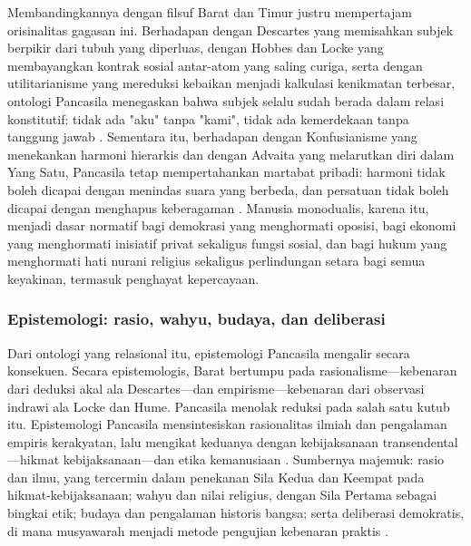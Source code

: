 \documentclass[journal]{IEEEtran}
\begin{document}
Membandingkannya dengan filsuf Barat dan Timur justru mempertajam orisinalitas gagasan ini. Berhadapan dengan Descartes yang memisahkan subjek berpikir dari tubuh yang diperluas, dengan Hobbes dan Locke yang membayangkan kontrak sosial antar-atom yang saling curiga, serta dengan utilitarianisme yang mereduksi kebaikan menjadi kalkulasi kenikmatan terbesar, ontologi Pancasila menegaskan bahwa subjek selalu sudah berada dalam relasi konstitutif: tidak ada "aku" tanpa "kami", tidak ada kemerdekaan tanpa tanggung jawab \cite{locke1988,mill1978,berlin1969}. Sementara itu, berhadapan dengan Konfusianisme yang menekankan harmoni hierarkis dan dengan Advaita yang melarutkan diri dalam Yang Satu, Pancasila tetap mempertahankan martabat pribadi: harmoni tidak boleh dicapai dengan menindas suara yang berbeda, dan persatuan tidak boleh dicapai dengan menghapus keberagaman \cite{latif2018,madungmere2021,taylor1994}. Manusia monodualis, karena itu, menjadi dasar normatif bagi demokrasi yang menghormati oposisi, bagi ekonomi yang menghormati inisiatif privat sekaligus fungsi sosial, dan bagi hukum yang menghormati hati nurani religius sekaligus perlindungan setara bagi semua keyakinan, termasuk penghayat kepercayaan.

\subsubsection{Epistemologi: rasio, wahyu, budaya, dan deliberasi}

Dari ontologi yang relasional itu, epistemologi Pancasila mengalir secara konsekuen. Secara epistemologis, Barat bertumpu pada rasionalisme---kebenaran dari deduksi akal ala Descartes---dan empirisme---kebenaran dari observasi indrawi ala Locke dan Hume. Pancasila menolak reduksi pada salah satu kutub itu. Epistemologi Pancasila mensintesiskan rasionalitas ilmiah dan pengalaman empiris kerakyatan, lalu mengikat keduanya dengan kebijaksanaan transendental---hikmat kebijaksanaan---dan etika kemanusiaan \cite{pristiwiyanto2021}. Sumbernya majemuk: rasio dan ilmu, yang tercermin dalam penekanan Sila Kedua dan Keempat pada hikmat-kebijaksanaan; wahyu dan nilai religius, dengan Sila Pertama sebagai bingkai etik; budaya dan pengalaman historis bangsa; serta deliberasi demokratis, di mana musyawarah menjadi metode pengujian kebenaran praktis \cite{madung2016,pristiwiyanto2021,latif2018}.
\end{document}
